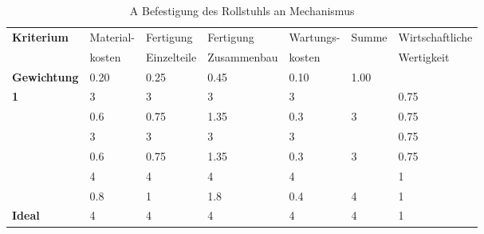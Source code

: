 \documentclass[10pt,a4paper]{article}
\begin{document}
\begin{table}[h!]
    \centering
    \hspace*{0in} %
    \begin{tabular}{>{\bfseries}p{2cm} p{2.2cm} p{2cm} p{2cm} p{2.5cm} p{2cm} p{2cm}}
        \toprule
        Kriterium  & Material- & Fertigung   & Fertigung   & Wartungs- & Summe & Wirtschaftliche \\
                   & kosten    & Einzelteile & Zusammenbau & kosten    &       & Wertigkeit      \\
        \midrule
        Gewichtung & 0.20      & 0.25        & 0.45        & 0.10      & 1.00  &                 \\
        \midrule
        1          & 3         & 3           & 3           & 3         &       & 0.75            \\
                   & 0.6       & 0.75        & 1.35        & 0.3       & 3     & 0.75            \\
        \addlinespace
        2          & 3         & 3           & 3           & 3         &       & 0.75            \\
                   & 0.6       & 0.75        & 1.35        & 0.3       & 3     & 0.75            \\
        \addlinespace
        3          & 4         & 4           & 4           & 4         &       & 1               \\
                   & 0.8       & 1           & 1.8         & 0.4       & 4     & 1               \\
        \addlinespace
        Ideal      & 4         & 4           & 4           & 4         & 4     & 1               \\
        \bottomrule
    \end{tabular}
    \caption{A Befestigung des Rollstuhls an Mechanismus}
    \label{tab:befestigung}
\end{table}
\end{document}
